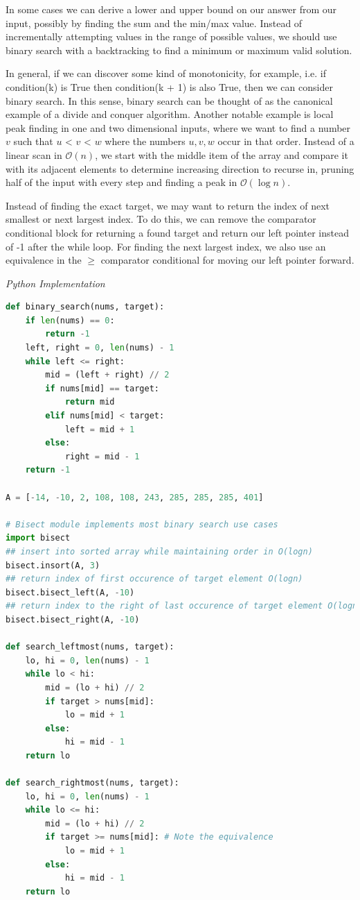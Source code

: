 \documentclass{article}
\newcommand{\bigO}{\mathcal{O}}
\begin{document}
    In some cases we can derive a lower and upper bound on our answer from our input, possibly by finding the sum and the min/max value. Instead of incrementally attempting values in the range of possible values, we should use binary search with a backtracking to find a minimum or maximum valid solution.
    
    In general, if we can discover some kind of monotonicity, for example, i.e. if condition(k) is True then condition(k + 1) is also True, then we can consider binary search. In this sense, binary search can be thought of as the canonical example of a divide and conquer algorithm. Another notable example is local peak finding in one and two dimensional inputs, where we want to find a number $v$ such that $u$ < $v$ < $w$ where the numbers $u,v,w$ occur in that order. Instead of a linear scan in $\bigO(n)$, we start with the middle item of the array and compare it with its adjacent elements to determine increasing direction to recurse in, pruning half of the input with every step and finding a peak in $\bigO(\log n)$.
    
    Instead of finding the exact target, we may want to return the index of next smallest or next largest index. To do this, we can remove the comparator conditional block for returning a found target and return our left pointer instead of -1 after the while loop. For finding the next largest index, we also use an equivalence in the $\geq$ comparator conditional for moving our left pointer forward.
    
\vspace{8pt} \emph{Python Implementation}
\begin{lstlisting}[language=Python]
def binary_search(nums, target):
    if len(nums) == 0:
        return -1
    left, right = 0, len(nums) - 1
    while left <= right:
        mid = (left + right) // 2
        if nums[mid] == target:
            return mid
        elif nums[mid] < target:
            left = mid + 1
        else:
            right = mid - 1
    return -1

A = [-14, -10, 2, 108, 108, 243, 285, 285, 285, 401]

# Bisect module implements most binary search use cases
import bisect
## insert into sorted array while maintaining order in O(logn)
bisect.insort(A, 3)
## return index of first occurence of target element O(logn)
bisect.bisect_left(A, -10)
## return index to the right of last occurence of target element O(logn)
bisect.bisect_right(A, -10)

def search_leftmost(nums, target):
    lo, hi = 0, len(nums) - 1
    while lo < hi:
        mid = (lo + hi) // 2
        if target > nums[mid]:
            lo = mid + 1
        else:
            hi = mid - 1
    return lo
    
def search_rightmost(nums, target):
    lo, hi = 0, len(nums) - 1
    while lo <= hi:
        mid = (lo + hi) // 2
        if target >= nums[mid]: # Note the equivalence
            lo = mid + 1
        else:
            hi = mid - 1
    return lo 
\end{lstlisting}
    
\end{document}

